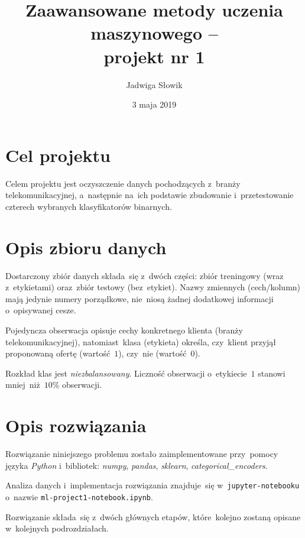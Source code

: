 \documentclass[11pt, a4paper]{article}
\title{Zaawansowane metody uczenia maszynowego -- \\
projekt nr 1}
\author{Jadwiga Słowik}
\date{3 maja 2019}
\begin{document}
\maketitle
\section{Cel projektu}
Celem projektu jest oczyszczenie danych pochodzących z~branży telekomunikacyjnej, a~następnie na~ich podstawie zbudowanie i~przetestowanie czterech wybranych klasyfikatorów binarnych.

\section{Opis zbioru danych}
Dostarczony zbiór danych składa~się z~dwóch części: zbiór treningowy (wraz z~etykietami) oraz~zbiór testowy (bez~etykiet). Nazwy zmiennych (cech/kolumn) mają jedynie numery porządkowe, nie~niosą żadnej dodatkowej informacji o~opisywanej cesze.

Pojedyncza obserwacja opisuje cechy konkretnego klienta (branży telekomunikacyjnej), natomiast~klasa (etykieta) określa, czy~klient przyjął proponowaną ofertę (wartość~$1$), czy~nie (wartość~$0$).

Rozkład klas jest \textit{niezbalansowany}. Liczność obserwacji o~etykiecie~$1$ stanowi mniej~niż~$10\%$ obserwacji.

\section{Opis rozwiązania}
Rozwiązanie niniejszego problemu zostało zaimplementowane przy~pomocy języka \textit{Python} i~bibliotek: \textit{numpy}, \textit{pandas}, \textit{sklearn}, \textit{categorical\_encoders}.

Analiza danych i~implementacja rozwiązania znajduje~się w~\texttt{jupyter-notebooku} o~nazwie \texttt{ml-project1-notebook.ipynb}.

Rozwiązanie składa~się z~dwóch głównych etapów, które~kolejno zostaną opisane w~kolejnych podrozdziałach.
\end{document}
